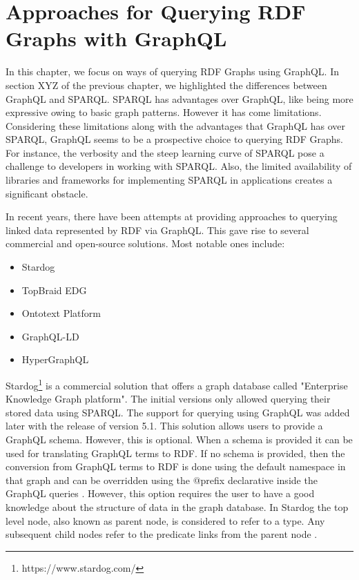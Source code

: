 \chapter{Approaches for Querying RDF Graphs with GraphQL}
\label{ch:3}
In this chapter, we focus on ways of querying RDF Graphs using GraphQL. In section XYZ of the previous chapter, we highlighted the differences between GraphQL and SPARQL. SPARQL has advantages over GraphQL, like being more expressive owing to basic graph patterns. However it has come limitations. Considering these limitations along with the advantages that GraphQL has over SPARQL, GraphQL seems to be a prospective choice to querying RDF Graphs. For instance, the verbosity and the steep learning curve of SPARQL pose a challenge to developers in working with SPARQL. Also, the limited availability of libraries and frameworks for implementing SPARQL in applications creates a significant obstacle. 


In recent years, there have been attempts at providing approaches to querying linked data represented by RDF via GraphQL. This gave rise to several commercial and open-source solutions. Most notable ones include:

\begin{itemize}
	\item Stardog
	\item TopBraid EDG
	\item Ontotext Platform
	\item GraphQL-LD
	\item HyperGraphQL

\end{itemize}

Stardog\footnote{https://www.stardog.com/} is a commercial solution that offers a graph database called "Enterprise Knowledge Graph platform"\cite{Angele2022}. The initial versions only allowed querying their stored data using SPARQL. The support for querying using GraphQL was added later with the release of version 5.1. This solution allows users to provide a GraphQL schema. However, this is optional. When a schema is provided it can be used for translating GraphQL terms to RDF. If no schema is provided, then the conversion from GraphQL terms to RDF is done using the default namespace in that graph and can be overridden using the @prefix declarative inside the GraphQL queries \cite{Taelman2019}. However, this option requires the user to have a good knowledge about the structure of data in the graph database. In Stardog the top level node, also known as parent node, is considered to refer to a type. Any subsequent child nodes refer to the predicate links from the parent node \cite{Taelman2019}.

